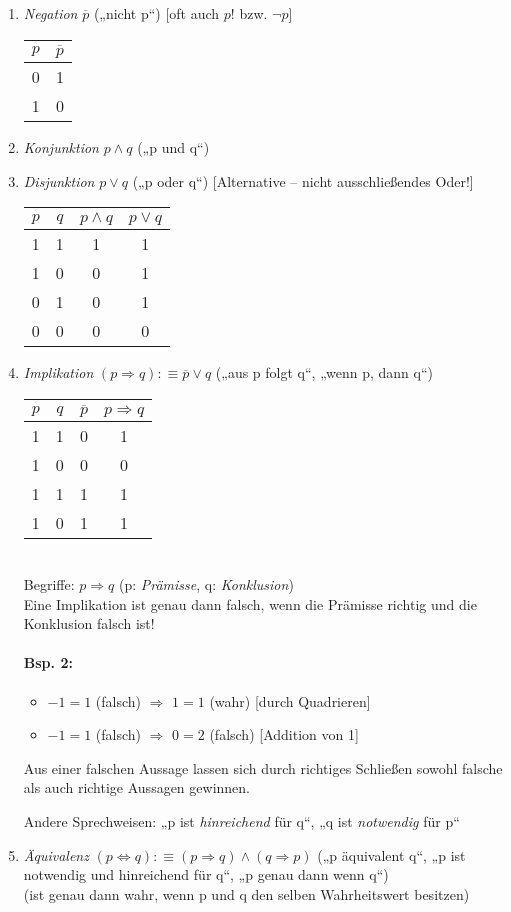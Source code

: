 \begin{enumerate}
\item \emph{Negation} $\overline{p}$ („nicht p“) [oft auch $p!$ bzw. $\neg p$]\\
\begin{tabular}{c | c}
$p$ & $\overline{p}$\\
\hline
0 & 1 \\
1 & 0 \\
\end{tabular}

\item \emph{Konjunktion} $p \wedge q$ („p und q“)
\item \emph{Disjunktion} $ p \vee q $ („p oder q“) [Alternative -- nicht ausschließendes Oder!]\\
\begin{tabular}{c | c |c |c}
$p$ & $q$ & $p \wedge q$ & $p \vee q$\\
\hline
1 & 1 &1&1\\
1 & 0 &0&1\\
0 & 1 &0&1\\
0 & 0 &0&0\\
\end{tabular}

\item \emph{Implikation} $(p \Rightarrow q ):\equiv \overline{p} \vee q$ („aus p folgt q“, „wenn p, dann q“)\\
\begin{tabular}{c | c |c|c}
$p$ & $q$ & $\overline{p}$ & $p\Rightarrow q$\\
\hline
1&1&0&1 \\
1&0&0&0\\
1&1&1&1\\
1&0&1&1\\
\end{tabular}\\
Begriffe: $p \Rightarrow q$ (p: \emph{Prämisse}, q: \emph{Konklusion})\\
Eine Implikation ist genau dann falsch, wenn die Prämisse richtig und die Konklusion falsch ist!
\paragraph{Bsp. 2:}
\begin{itemize}
\item $-1=1$ (falsch) $\Rightarrow$ $1=1$ (wahr) [durch Quadrieren]
\item $-1=1$ (falsch) $\Rightarrow$ $0=2$ (falsch) [Addition von 1]
\end{itemize}
Aus einer falschen Aussage lassen sich durch richtiges Schließen sowohl falsche als auch richtige Aussagen gewinnen.

Andere Sprechweisen: „p ist \emph{hinreichend} für q“, „q ist \emph{notwendig} für p“
\item \emph{Äquivalenz} $(p\Leftrightarrow q):\equiv (p\Rightarrow q) \wedge (q \Rightarrow p)$ („p äquivalent q“, „p ist notwendig und hinreichend für q“, „p genau dann wenn q“)\\
(ist genau dann wahr, wenn p und q den selben Wahrheitswert besitzen)
\end{enumerate}

